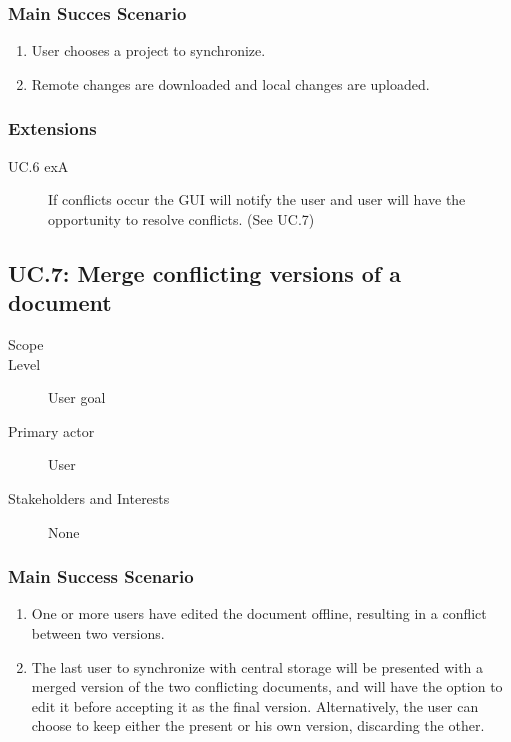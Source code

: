\subsubsection{Main Succes Scenario}
\begin{enumerate}
    \item User chooses a project to synchronize.
    \item Remote changes are downloaded and local changes are uploaded.
\end{enumerate}
    
\subsubsection{Extensions}
\begin{description}
    \item[UC.6 exA] If conflicts occur the GUI will notify the user and user will have the opportunity to resolve conflicts. (See UC.7)
\end{description}
    
\subsection{UC.7: Merge conflicting versions of a document}
\begin{description}
    \item[Scope] \SOP{}
    \item[Level] User goal
    \item[Primary actor] User
    \item[Stakeholders and Interests] None
\end{description}
    
\subsubsection{Main Success Scenario}
\begin{enumerate}
    \item One or more users have edited the document offline, resulting in a conflict between two versions.
    \item The last user to synchronize with central storage will be presented with a merged version of the two conflicting documents, and will have the option to edit it before accepting it as the final version. Alternatively, the user can choose to keep either the present or his own version, discarding the other.
\end{enumerate}
